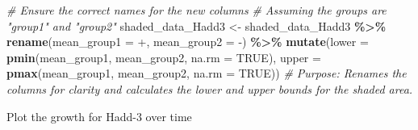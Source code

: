 \documentclass[
  11pt,
]{article}
\newenvironment{Shaded}{\begin{snugshade}}{\end{snugshade}}
\newcommand{\AttributeTok}[1]{\textcolor[rgb]{0.13,0.29,0.53}{#1}}
\newcommand{\CommentTok}[1]{\textcolor[rgb]{0.56,0.35,0.01}{\textit{#1}}}
\newcommand{\ConstantTok}[1]{\textcolor[rgb]{0.56,0.35,0.01}{#1}}
\newcommand{\FunctionTok}[1]{\textcolor[rgb]{0.13,0.29,0.53}{\textbf{#1}}}
\newcommand{\NormalTok}[1]{#1}
\newcommand{\OtherTok}[1]{\textcolor[rgb]{0.56,0.35,0.01}{#1}}
\newcommand{\SpecialCharTok}[1]{\textcolor[rgb]{0.81,0.36,0.00}{\textbf{#1}}}
\newcommand{\StringTok}[1]{\textcolor[rgb]{0.31,0.60,0.02}{#1}}
\begin{document}
\begin{Shaded}
\begin{Highlighting}[]
\CommentTok{\# Ensure the correct names for the new columns}
\CommentTok{\# Assuming the groups are "group1" and "group2"}
\NormalTok{shaded\_data\_Hadd3 }\OtherTok{\textless{}{-}}\NormalTok{ shaded\_data\_Hadd3 }\SpecialCharTok{\%\textgreater{}\%}
  \FunctionTok{rename}\NormalTok{(}\AttributeTok{mean\_group1 =} \StringTok{\textasciigrave{}}\AttributeTok{+}\StringTok{\textasciigrave{}}\NormalTok{, }\AttributeTok{mean\_group2 =} \StringTok{\textasciigrave{}}\AttributeTok{{-}}\StringTok{\textasciigrave{}}\NormalTok{) }\SpecialCharTok{\%\textgreater{}\%}
  \FunctionTok{mutate}\NormalTok{(}\AttributeTok{lower =} \FunctionTok{pmin}\NormalTok{(mean\_group1, mean\_group2, }\AttributeTok{na.rm =} \ConstantTok{TRUE}\NormalTok{),}
         \AttributeTok{upper =} \FunctionTok{pmax}\NormalTok{(mean\_group1, mean\_group2, }\AttributeTok{na.rm =} \ConstantTok{TRUE}\NormalTok{))}
\CommentTok{\# Purpose: Renames the columns for clarity and calculates the lower and upper bounds for the shaded area.}
\end{Highlighting}
\end{Shaded}

Plot the growth for Hadd-3 over time
\end{document}
